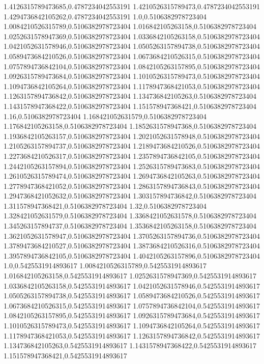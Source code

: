 1.4126315789473685,0.4787234042553191
1.4210526315789473,0.4787234042553191
1.4294736842105262,0.4787234042553191
1.0,0.5106382978723404
1.0084210526315789,0.5106382978723404
1.016842105263158,0.5106382978723404
1.0252631578947369,0.5106382978723404
1.0336842105263158,0.5106382978723404
1.0421052631578946,0.5106382978723404
1.0505263157894738,0.5106382978723404
1.0589473684210526,0.5106382978723404
1.0673684210526315,0.5106382978723404
1.0757894736842104,0.5106382978723404
1.0842105263157895,0.5106382978723404
1.0926315789473684,0.5106382978723404
1.1010526315789473,0.5106382978723404
1.1094736842105264,0.5106382978723404
1.1178947368421053,0.5106382978723404
1.1263157894736842,0.5106382978723404
1.134736842105263,0.5106382978723404
1.1431578947368422,0.5106382978723404
1.151578947368421,0.5106382978723404
1.16,0.5106382978723404
1.168421052631579,0.5106382978723404
1.176842105263158,0.5106382978723404
1.1852631578947368,0.5106382978723404
1.1936842105263157,0.5106382978723404
1.2021052631578948,0.5106382978723404
1.2105263157894737,0.5106382978723404
1.2189473684210526,0.5106382978723404
1.2273684210526317,0.5106382978723404
1.2357894736842105,0.5106382978723404
1.2442105263157894,0.5106382978723404
1.2526315789473683,0.5106382978723404
1.2610526315789474,0.5106382978723404
1.2694736842105263,0.5106382978723404
1.2778947368421052,0.5106382978723404
1.2863157894736843,0.5106382978723404
1.2947368421052632,0.5106382978723404
1.303157894736842,0.5106382978723404
1.311578947368421,0.5106382978723404
1.32,0.5106382978723404
1.328421052631579,0.5106382978723404
1.3368421052631578,0.5106382978723404
1.345263157894737,0.5106382978723404
1.3536842105263158,0.5106382978723404
1.3621052631578947,0.5106382978723404
1.3705263157894736,0.5106382978723404
1.3789473684210527,0.5106382978723404
1.3873684210526316,0.5106382978723404
1.3957894736842105,0.5106382978723404
1.4042105263157896,0.5106382978723404
1.0,0.5425531914893617
1.0084210526315789,0.5425531914893617
1.016842105263158,0.5425531914893617
1.0252631578947369,0.5425531914893617
1.0336842105263158,0.5425531914893617
1.0421052631578946,0.5425531914893617
1.0505263157894738,0.5425531914893617
1.0589473684210526,0.5425531914893617
1.0673684210526315,0.5425531914893617
1.0757894736842104,0.5425531914893617
1.0842105263157895,0.5425531914893617
1.0926315789473684,0.5425531914893617
1.1010526315789473,0.5425531914893617
1.1094736842105264,0.5425531914893617
1.1178947368421053,0.5425531914893617
1.1263157894736842,0.5425531914893617
1.134736842105263,0.5425531914893617
1.1431578947368422,0.5425531914893617
1.151578947368421,0.5425531914893617
